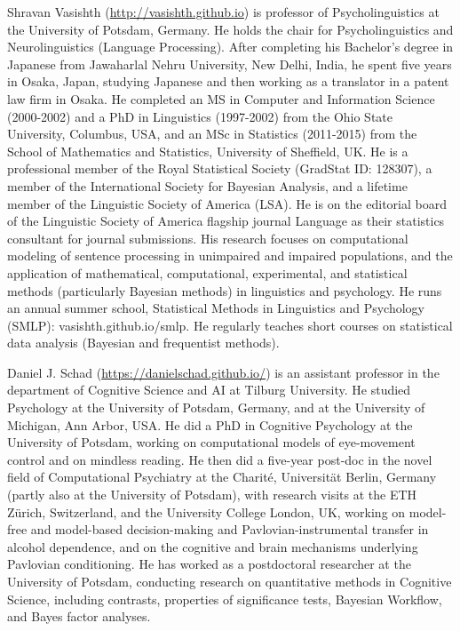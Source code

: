 \documentclass[12pt,]{krantz}
\begin{document}
Shravan Vasishth (\url{http://vasishth.github.io}) is professor of Psycholinguistics at the University of Potsdam, Germany. He holds the chair for Psycholinguistics and Neurolinguistics (Language Processing). After completing his Bachelor's degree in Japanese from Jawaharlal Nehru University, New Delhi, India, he spent five years in Osaka, Japan, studying Japanese and then working as a translator in a patent law firm in Osaka. He completed an MS in Computer and Information Science (2000-2002) and a PhD in Linguistics (1997-2002) from the Ohio State University, Columbus, USA, and an MSc in Statistics (2011-2015) from the School of Mathematics and Statistics, University of Sheffield, UK. He is a professional member of the Royal Statistical Society (GradStat ID: 128307), a member of the International Society for Bayesian Analysis, and a lifetime member of the Linguistic Society of America (LSA). He is on the editorial board of the Linguistic Society of America flagship journal Language as their statistics consultant for journal submissions. His research focuses on computational modeling of sentence processing in unimpaired and impaired populations, and the application of mathematical, computational, experimental, and statistical methods (particularly Bayesian methods) in linguistics and psychology. He runs an annual summer school, Statistical Methods in Linguistics and Psychology (SMLP): vasishth.github.io/smlp. He regularly teaches short courses on statistical data analysis (Bayesian and frequentist methods).

Daniel J. Schad (\url{https://danielschad.github.io/}) is an assistant professor in the department of Cognitive Science and AI at Tilburg University. He studied Psychology at the University of Potsdam, Germany, and at the University of Michigan, Ann Arbor, USA. He did a PhD in Cognitive Psychology at the University of Potsdam, working on computational models of eye-movement control and on mindless reading. He then did a five-year post-doc in the novel field of Computational Psychiatry at the Charité, Universität Berlin, Germany (partly also at the University of Potsdam), with research visits at the ETH Zürich, Switzerland, and the University College London, UK, working on model-free and model-based decision-making and Pavlovian-instrumental transfer in alcohol dependence, and on the cognitive and brain mechanisms underlying Pavlovian conditioning. He has worked as a postdoctoral researcher at the University of Potsdam, conducting research on quantitative methods in Cognitive Science, including contrasts, properties of significance tests, Bayesian Workflow, and Bayes factor analyses.
\end{document}
